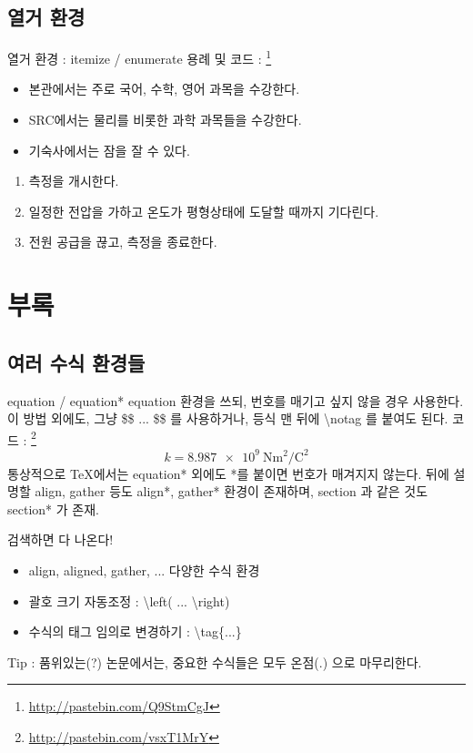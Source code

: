 \documentclass[12pt]{beamer}
\begin{document}
\subsection{열거 환경}
\begin{frame}{열거 환경 : itemize / enumerate}
	용례 및 코드 : \footnote{\url{http://pastebin.com/Q9StmCgJ}}
	\begin{itemize}
		\item 본관에서는 주로 국어, 수학, 영어 과목을 수강한다.
		\item SRC에서는 물리를 비롯한 과학 과목들을 수강한다.
		\item 기숙사에서는 잠을 잘 수 있다.
	\end{itemize}
	\begin{enumerate}
		\item 측정을 개시한다.
		\item 일정한 전압을 가하고 온도가 평형상태에 도달할 때까지 기다린다.
		\item 전원 공급을 끊고, 측정을 종료한다.
	\end{enumerate}
\end{frame}
\section{부록}
\subsection{여러 수식 환경들}
\begin{frame}{equation / equation*}
	equation 환경을 쓰되, 번호를 매기고 싶지 않을 경우 사용한다. 이 방법 외에도, 그냥 \$\$ ... \$\$ 를 사용하거나, 등식 맨 뒤에 \textbackslash notag 를 붙여도 된다. 코드 : \footnote{\url{http://pastebin.com/vsxT1MrY} }
	\begin{equation*}
	k = \SI{8.987e9}{\newton\square\meter\per\square\coulomb}
	\end{equation*}
	통상적으로 \TeX 에서는 equation* 외에도 *를 붙이면 번호가 매겨지지 않는다. 뒤에 설명할 align, gather 등도 align*, gather* 환경이 존재하며, section 과 같은 것도 section* 가 존재.
\end{frame}
\begin{frame}{검색하면 다 나온다!}
	\begin{itemize}
		\item align, aligned, gather, ... 다양한 수식 환경
		\item 괄호 크기 자동조정 : \textbackslash left( ... \textbackslash right)
		\item 수식의 태그 임의로 변경하기 : \textbackslash tag\{...\}
	\end{itemize}
	Tip : 품위있는(?) 논문에서는, 중요한 수식들은 모두 온점(.) 으로 마무리한다.
\end{frame}
\end{document}

